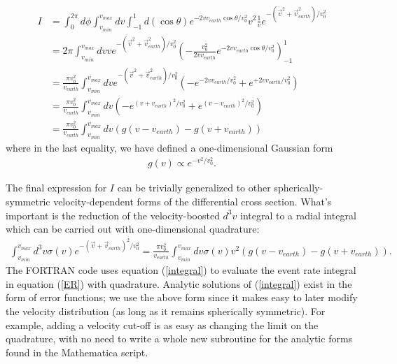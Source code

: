 \documentclass[11pt]{amsart}
\begin{document}
\begin{equation}
\begin{split}
	I &=  \int_0^{2\pi} d\phi \int_{v_{min}}^{v_{max}} dv \int_{-1}^1 d(\cos \theta) e^{-2vv_{earth}\cos\theta/v_0^2} v^2 \frac{1}{v} e^{-(\vec{v}^2+\vec{v}^2_{earth})/v_0^2}\\
	&= 2\pi \int_{v_{min}}^{v_{max}} dv v e^{-(\vec{v}^2+\vec{v}^2_{earth})/v_0^2} \left(-\frac{v_0^2}{2vv_{earth}} e^{-2vv_{earth}\cos\theta/v_0^2}\right)_{-1}^1\\
	&= \frac{\pi v_0^2}{v_{earth} }\int_{v_{min}}^{v_{max}} dv e^{-(\vec{v}^2+\vec{v}^2_{earth})/v_0^2} 
		\left(- e^{-2vv_{earth}/v_0^2} + e^{+2vv_{earth}/v_0^2}\right)\\
	&= \frac{\pi v_0^2}{v_{earth} }\int_{v_{min}}^{v_{max}} dv 
		\left(- e^{(v+v_{earth})^2/v_0^2} + e^{(v-v_{earth})^2/v_0^2}\right)\\
	&= \frac{\pi v_0^2}{v_{earth} }\int_{v_{min}}^{v_{max}} dv 
		\left( g(v-v_{earth}) - g(v+v_{earth}) \right)
\end{split}
\end{equation}
where in the last equality, we have defined a one-dimensional Gaussian form
\begin{equation}
\begin{split}
	g(v) \propto e^{-v^2/v_0^2}.
\end{split}
\end{equation}

The final expression for $I$ can be trivially generalized to other spherically-symmetric velocity-dependent forms of the differential cross section. What's important is the reduction of the velocity-boosted $d^3v$ integral to a radial integral which can be carried out with one-dimensional quadrature:
\begin{equation}\label{integral}
\begin{split}
\int_{v_{min}}^{v_{max}} d^3v \sigma(v) e^{-(\vec{v}+\vec{v}_{earth})^2/v_0^2} 
	= \frac{\pi v_0^2}{v_{earth} }\int_{v_{min}}^{v_{max}} dv \sigma(v) v^2\left( g(v-v_{earth}) - g(v+v_{earth}) \right).
\end{split}
\end{equation}
The FORTRAN code uses equation (\ref{integral}) to evaluate the event rate integral in equation (\ref{ER}) with quadrature. Analytic solutions of  (\ref{integral}) exist in the form of error functions; we use the above form since it makes easy to later modify the velocity distribution (as long as it remains spherically symmetric). For example, adding a velocity cut-off is as easy as changing the limit on the quadrature, with no need to write a whole new subroutine for the analytic forms found in the Mathematica script.
\end{document}
